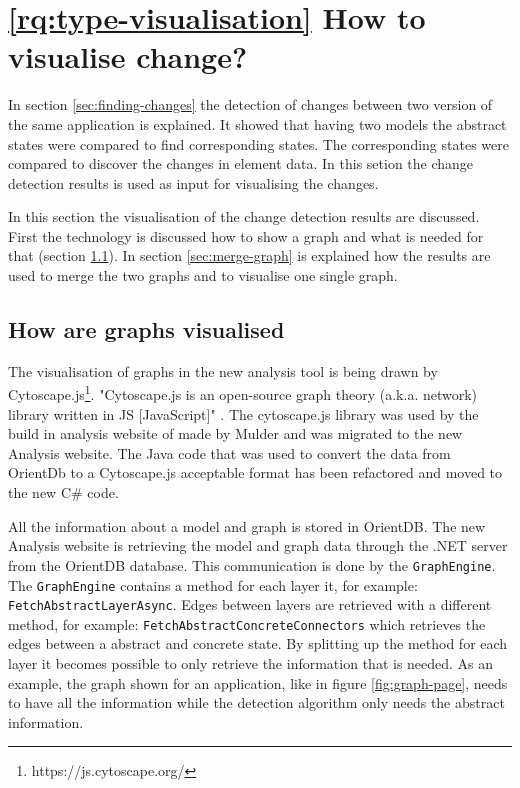 \section{\ref{rq:type-visualisation} How to visualise change?} \label{rq:type-visualisation-answer}
In section \ref{sec:finding-changes} the detection of changes between two version of the same application is explained. It showed that having two models the abstract states were compared to find corresponding states. The corresponding states were compared to discover the changes in element data. In this setion the change detection results is used as input for visualising the changes. 

In this section the visualisation of the change detection results are discussed. First the technology is discussed how to show a graph and what is needed for that (section \ref{sec:graph-visualisation}). In section \ref{sec:merge-graph} is explained how the results are used to merge the two graphs and to visualise one single graph.

\subsection{How are graphs visualised} \label{sec:graph-visualisation}

The visualisation of graphs in the new analysis tool is being drawn by Cytoscape.js\footnote{https://js.cytoscape.org/}. "Cytoscape.js is an open-source graph theory (a.k.a. network) library written in JS [JavaScript]" \cite{cytoscape-js}. The cytoscape.js library was used by the build in analysis website of \testar made by Mulder \cite{thesisMulders} and was migrated to the new Analysis website. The Java code that was used to convert the data from OrientDb to a Cytoscape.js acceptable format has been refactored and moved to the new C\# code.

All the information about a model and graph is stored in OrientDB. The new Analysis website is retrieving the model and graph data through the \testar .NET server from the OrientDB database. This communication is done by the \verb|GraphEngine|. The \verb|GraphEngine| contains a method for each layer it, for example: \verb|FetchAbstractLayerAsync|. Edges between layers are retrieved with a different method, for example: \verb|FetchAbstractConcreteConnectors| which retrieves the edges between a abstract and concrete state. By splitting up the method for each layer it becomes possible to only retrieve the information that is needed. As an example, the graph shown for an application, like in figure \ref{fig:graph-page}, needs to have all the information while the detection algorithm only needs the abstract information. 

